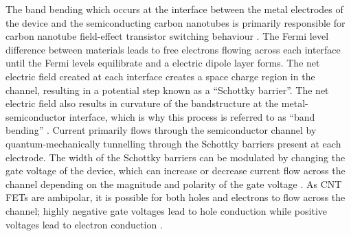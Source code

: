 \documentclass[
  a4paper,
]{scrbook}
\begin{document}
The band bending which occurs at the interface between the metal
electrodes of the device and the semiconducting carbon nanotubes is
primarily responsible for carbon nanotube field-effect transistor
switching behaviour \autocite{Avouris2007,Bargaoui2018}. The Fermi level
difference between materials leads to free electrons flowing across each
interface until the Fermi levels equilibrate and a electric dipole layer
forms. The net electric field created at each interface creates a space
charge region in the channel, resulting in a potential step known as a
``Schottky barrier''. The net electric field also results in curvature
of the bandstructure at the metal-semiconductor interface, which is why
this process is referred to as ``band bending'' \autocite{Zhang2012}.
Current primarily flows through the semiconductor channel by
quantum-mechanically tunnelling through the Schottky barriers present at
each electrode. The width of the Schottky barriers can be modulated by
changing the gate voltage of the device, which can increase or decrease
current flow across the channel depending on the magnitude and polarity
of the gate voltage \autocite{Avouris2007,Bargaoui2018}. As CNT FETs are
ambipolar, it is possible for both holes and electrons to flow across
the channel; highly negative gate voltages lead to hole conduction while
positive voltages lead to electron conduction \autocite{Avouris2007}.
\end{document}
